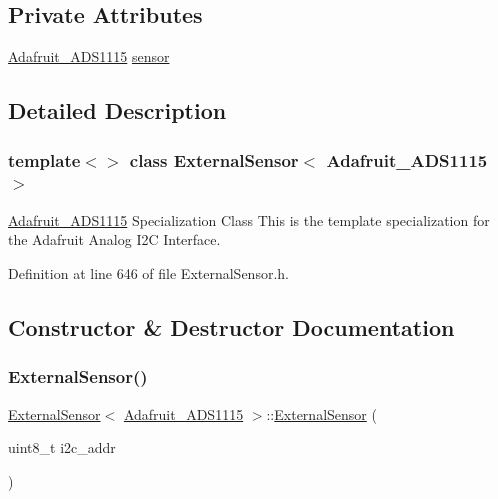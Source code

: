 \subsection*{Private Attributes}
\begin{DoxyCompactItemize}
\item 
\hyperlink{class_adafruit___a_d_s1115}{Adafruit\+\_\+\+A\+D\+S1115} \hyperlink{class_external_sensor_3_01_adafruit___a_d_s1115_01_4_a0e1585ff946f9ce0e259d515baa4ad54}{sensor}
\end{DoxyCompactItemize}


\subsection{Detailed Description}
\subsubsection*{template$<$$>$\newline
class External\+Sensor$<$ Adafruit\+\_\+\+A\+D\+S1115 $>$}

\hyperlink{class_adafruit___a_d_s1115}{Adafruit\+\_\+\+A\+D\+S1115} Specialization Class This is the template specialization for the Adafruit Analog I2C Interface. 

Definition at line 646 of file External\+Sensor.\+h.



\subsection{Constructor \& Destructor Documentation}
\mbox{\label{class_external_sensor_3_01_adafruit___a_d_s1115_01_4_aff5ed681a7c261462092516a5cc571e1}} 
\subsubsection{\texorpdfstring{External\+Sensor()}{ExternalSensor()}}
{\footnotesize\ttfamily \hyperlink{class_external_sensor}{External\+Sensor}$<$ \hyperlink{class_adafruit___a_d_s1115}{Adafruit\+\_\+\+A\+D\+S1115} $>$\+::\hyperlink{class_external_sensor}{External\+Sensor} (\begin{DoxyParamCaption}\item[{uint8\+\_\+t}]{i2c\+\_\+addr }\end{DoxyParamCaption})\hspace{0.3cm}{\ttfamily [inline]}}

